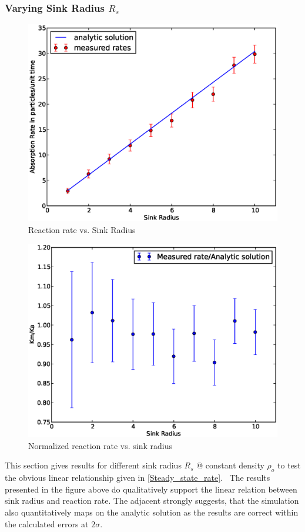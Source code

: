 \subsubsection{Varying Sink Radius $R_s$}
\begin{figure}[h]
    \centering
\includegraphics[width = .8 \textwidth]{plots/np/rs/KabsRs.eps}
    \caption{Reaction rate vs. Sink Radius}
    \label{fig:KabsRs}
\end{figure}
\begin{figure}
    \centering
    \includegraphics[width = .58 \textwidth]{plots/np/rs/KrelRs.eps}
    \caption{Normalized reaction rate vs. sink radius}
    \label{fig:KrelRs}
\end{figure}
This section gives results for different sink radius $R_s$ @ constant density $\rho_o$ to test the obvious linear relationship given in \eqref{Steady_state_rate}.
\
The results presented in the figure above do qualitatively support the linear relation between sink radius and reaction rate.
The adjacent strongly suggests, that the simulation also quantitatively maps on the analytic solution as the results are correct within the calculated errors at $2 \sigma$.
